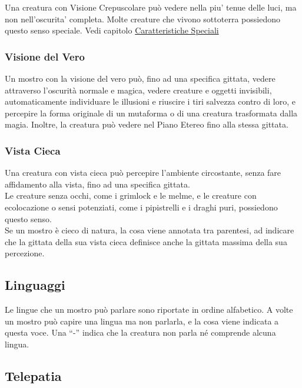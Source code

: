 Una creatura con Visione Crepuscolare può vedere nella piu' tenue delle luci, ma non nell'oscurita' completa. Molte creature che vivono sottoterra possiedono questo senso
speciale.  Vedi capitolo \hyperref[sec:sec:visione-e-luce]{Caratteristiche Speciali}

\subsubsection{Visione del Vero}

Un mostro con la visione del vero può, fino ad una specifica gittata, vedere attraverso l'oscurità normale e magica, vedere creature e oggetti invisibili, automaticamente individuare le illusioni e riuscire i tiri salvezza contro di loro, e percepire la forma originale di un mutaforma o di una creatura trasformata dalla magia. Inoltre, la creatura può vedere nel Piano Etereo fino alla stessa gittata.

\subsubsection{Vista Cieca}

Una creatura con vista cieca può percepire l'ambiente circostante, senza fare affidamento alla vista, fino ad una specifica gittata. \\
Le creature senza occhi, come i grimlock e le melme, e le creature con ecolocazione o sensi potenziati, come i pipistrelli e i draghi puri, possiedono questo senso. \\
Se un mostro è cieco di natura, la cosa viene annotata tra parentesi, ad indicare che la gittata della sua vista cieca definisce anche la gittata massima della sua percezione.\\

\subsection{Linguaggi}

Le lingue che un mostro può parlare sono riportate in ordine alfabetico. A volte un mostro può capire una lingua ma non parlarla, e la cosa viene indicata a questa voce. Una ``-'' indica che la creatura non parla né comprende alcuna lingua.

\subsection{Telepatia}

